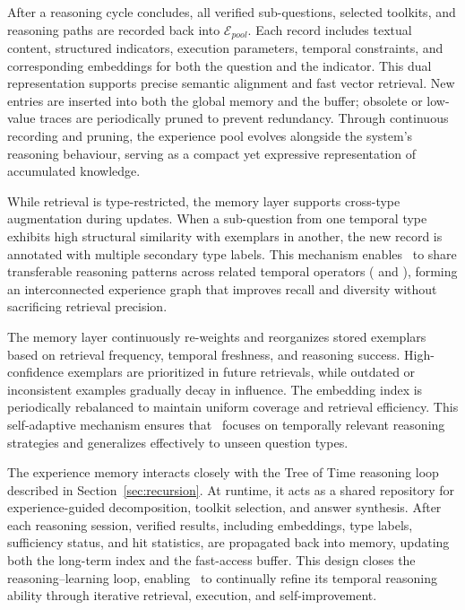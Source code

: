 After a reasoning cycle concludes, all verified sub-questions, selected toolkits, and reasoning paths 
are recorded back into $\mathcal{E}_{pool}$.  
Each record includes textual content, structured indicators, execution parameters, temporal constraints, 
and corresponding embeddings for both the question and the indicator.  
This dual representation supports precise semantic alignment and fast vector retrieval.  
New entries are inserted into both the global memory and the buffer; 
obsolete or low-value traces are periodically pruned to prevent redundancy.  
Through continuous recording and pruning, the experience pool evolves alongside the system’s reasoning behaviour, 
serving as a compact yet expressive representation of accumulated knowledge.

While retrieval is type-restricted, the memory layer supports cross-type augmentation during updates.  
When a sub-question from one temporal type exhibits high structural similarity with exemplars in another, 
the new record is annotated with multiple secondary type labels.  
This mechanism enables \mot\ to share transferable reasoning patterns across related temporal operators 
(\eg  {} and ), forming an interconnected experience graph that 
improves recall and diversity without sacrificing retrieval precision.

The memory layer continuously re-weights and reorganizes stored exemplars based on retrieval frequency, 
temporal freshness, and reasoning success.  
High-confidence exemplars are prioritized in future retrievals, 
while outdated or inconsistent examples gradually decay in influence.  
The embedding index is periodically rebalanced to maintain uniform coverage and retrieval efficiency.  
This self-adaptive mechanism ensures that \mot\ focuses on temporally relevant reasoning strategies 
and generalizes effectively to unseen question types.

The experience memory interacts closely with the Tree of Time reasoning loop described in Section~\ref{sec:recursion}.  
At runtime, it acts as a shared repository for experience-guided decomposition, toolkit selection, and answer synthesis.  
After each reasoning session, verified results, including embeddings, type labels, sufficiency status, and hit statistics, are 
propagated back into memory, updating both the long-term index and the fast-access buffer.  
This design closes the reasoning–learning loop, enabling \mot\ to continually refine its temporal reasoning ability 
through iterative retrieval, execution, and self-improvement.



